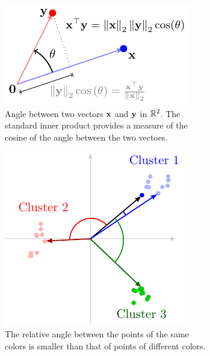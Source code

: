 \begin{figure}[h]
    \centering
    \begin{subfigure}[b]{0.45\textwidth}
        \includegraphics[width=0.95\linewidth]{figure/chapter01/angle-demo.pdf}
        \caption{Angle between two vectors $\mathbf{x}$ and $\mathbf{y}$ in $\mathbb{R}^2$. The standard inner product provides a measure of the cosine of the angle between the two vectoes.}
        \label{fig:angle1}
    \end{subfigure}
    \hspace{0.05\textwidth}
    \begin{subfigure}[b]{0.4\textwidth}
        \centering
        \includegraphics[width=0.85\linewidth]{figure/chapter01/cluster-angle.pdf}
        \caption{The relative angle between the points of the same colors is smaller than that of points of different colors.}
        \label{fig:angle-clusters}
    \end{subfigure}
    \caption{}
\end{figure}

